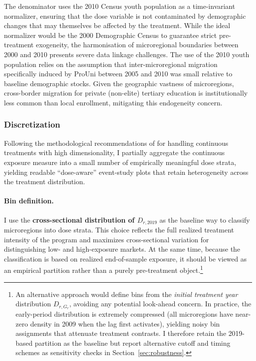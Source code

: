 The denominator uses the 2010 Census youth population as a time-invariant normalizer, ensuring that the dose variable is not contaminated by demographic changes that may themselves be affected by the treatment. While the ideal normalizer would be the 2000 Demographic Census to guarantee strict pre-treatment exogeneity, the harmonisation of microregional boundaries between 2000 and 2010 presents severe data linkage challenges. The use of the 2010 youth population relies on the assumption that inter-microregional migration specifically induced by ProUni between 2005 and 2010 was small relative to baseline demographic stocks. Given the geographic vastness of microregions, cross-border migration for private (non-elite) tertiary education is institutionally less common than local enrollment, mitigating this endogeneity concern.


\subsubsection{Discretization}
\label{sec:discretization}
Following the methodological recommendations of  for handling continuous treatments with high dimensionality, I partially aggregate the continuous exposure measure into a small number of empirically meaningful dose strata, yielding readable ``dose-aware'' event-study plots that retain heterogeneity across the treatment distribution.

\paragraph{Bin definition.}
I use the \textbf{cross-sectional distribution of $D_{r,2019}$} as the baseline way to classify microregions into dose strata. This choice reflects the full realized treatment intensity of the program and maximizes cross-sectional variation for distinguishing low- and high-exposure markets. At the same time, because the classification is based on realized end-of-sample exposure, it should be viewed as an empirical partition rather than a purely pre-treatment object.\footnote{An alternative approach would define bins from the \emph{initial treatment year} distribution $D_{r,G_r}$, avoiding any potential look-ahead concern. In practice, the early-period distribution is extremely compressed (all microregions have near-zero density in 2009 when the lag first activates), yielding noisy bin assignments that attenuate treatment contrasts. I therefore retain the 2019-based partition as the baseline but report alternative cutoff and timing schemes as sensitivity checks in Section~\ref{sec:robustness}.}

